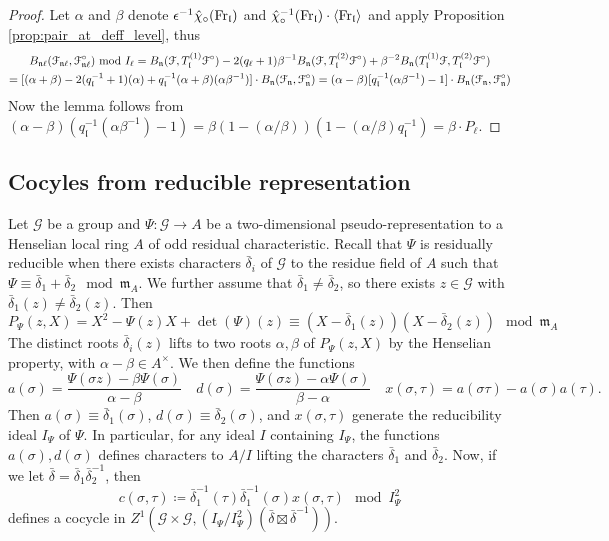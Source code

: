 \documentclass[leqno]{amsart}
\theoremstyle{definition}
\theoremstyle{remark}
\newcommand{\Fr}{\textnormal{Fr}} %
\newcommand{\fm}{\mathfrak{m}}
\newcommand{\fn}{\mathfrak{n}}
\newcommand{\fl}{\mathfrak{l}}
\newcommand{\euF}{\EuScript{F}} %
\begin{document}
\begin{proof}
Let $\alpha$ and  $\beta$ denote 
$\epsilon^{-1}\hat{\chi}_\circ(\Fr_\fl)$ and 
$\hat{\chi}_\circ^{-1}(\Fr_\fl)\cdot
\langle \Fr_\fl\rangle$
and apply Proposition \ref{prop:pair_at_deff_level}, thus
\begin{multline*}
B_{\fn\ell}(\euF_{\fn\ell}, \euF^{\circ}_{\fn\ell})
\text{ mod }I_\ell=
B_\fn(\euF, T_\fl^{(1)}\euF^\circ)
-2(q_\ell+1)\beta^{-1}B_\fn(\euF, T_\fl^{(2)}\euF^\circ)
+\beta^{-2}B_\fn(T_\fl^{(1)}\euF, T_\fl^{(2)}\euF^\circ)
\\=
[(\alpha+\beta)-2(q_\fl^{-1}+1)(\alpha)
+q_\fl^{-1}(\alpha+\beta)(\alpha\beta^{-1})]\cdot 
B_\fn(\euF_{\fn}, \euF^\circ_\fn)=
(\alpha-\beta)[q_\fl^{-1}(\alpha\beta^{-1})-1]\cdot 
B_\fn(\euF_{\fn}, \euF^\circ_\fn)
\end{multline*}
Now the lemma follows from
$(\alpha-\beta)(q_\fl^{-1}(\alpha\beta^{-1})-1)
=\beta(1-(\alpha/\beta))(1-(\alpha/\beta)q_\fl^{-1})
=\beta\cdot P_\ell$.
\end{proof}

\subsection{Cocyles from reducible representation}

Let $\mathcal{G}$ be a group and 
$\Psi\colon \mathcal{G}\to A$
be a two-dimensional pseudo-representation
to a Henselian local ring $A$
of odd residual characteristic.
Recall that 
$\Psi$ is residually reducible
when there exists characters
$ \bar{\delta}_i$ of $\mathcal{G}$
to the residue field of  $A$
such that  
$\Psi\equiv \bar{\delta}_1+\bar{\delta}_2\mod \fm_A$.
We further assume that $\bar{\delta}_1\neq \bar{\delta}_2$,
so there exists $z\in \mathcal{G}$
with  $\bar{\delta}_1(z)\neq \bar{\delta}_2(z)$.
Then
\begin{equation}
    P_\Psi(z,X)=
    X^2-\Psi(z)X+\det(\Psi)(z) \equiv 
    (X-\bar{\delta}_1(z))(X-\bar{\delta}_2(z))
    \mod \fm_A
\end{equation}
The distinct roots $\bar{\delta}_i(z)$
lifts to two roots $\alpha,\beta$ of  $P_\Psi(z,X)$
by the Henselian property,
with $\alpha-\beta\in A^\times$.
We then define the functions
\begin{equation}
   a(\sigma)=
   \frac{\Psi(\sigma z)-\beta\Psi(\sigma)}{\alpha-\beta}\quad
   d(\sigma)=
   \frac{\Psi(\sigma z)-\alpha\Psi(\sigma)}{\beta-\alpha}\quad
   x(\sigma,\tau)=a(\sigma\tau)-a(\sigma)a(\tau).
\end{equation}
Then 
$a(\sigma)\equiv \bar{\delta}_1(\sigma)$,
$d(\sigma)\equiv \bar{\delta}_2(\sigma)$,
and $x(\sigma,\tau)$
generate the reducibility ideal
$I_\Psi$ of  $\Psi$.
In particular,
for any ideal $I$ containing $I_\Psi$,
the functions $a(\sigma),d(\sigma)$
defines characters to  $A/I$
lifting the characters
$\bar{\delta}_1$ and $\bar{\delta}_2$.
Now, if we let
$\bar{\delta}=\bar{\delta}_1\bar{\delta}_2^{-1}$, then
\begin{equation*}
    c(\sigma,\tau)\coloneqq \bar{\delta}_1^{-1}(\tau)
    \bar{\delta}_1^{-1}(\sigma)x(\sigma, \tau)\mod I_\Psi^2
\end{equation*}
defines a cocycle in 
$Z^1(\mathcal{G}\times \mathcal{G}, 
(I_\Psi/I_\Psi^2)(\bar{\delta}\boxtimes \bar{\delta}^{-1}))$.
\end{document}
